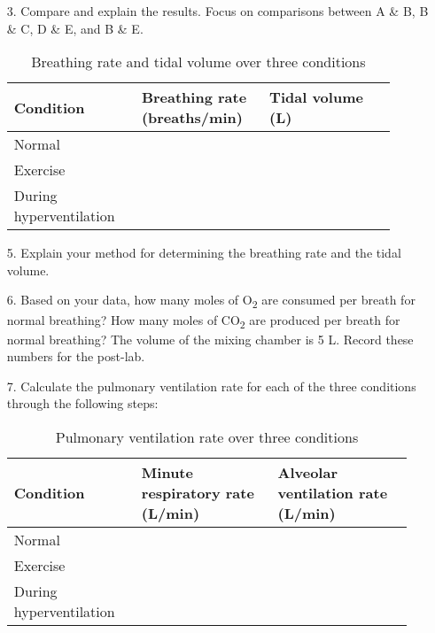 \documentclass{article}
\begin{document}
\begin{itemize}
	\item[3.] Compare and explain the results. Focus on comparisons between A \& B, B \& C, D \& E, and B \& E.\pagebreak
	
	\begin{table}[h]
	\centering
	\caption{Breathing rate and tidal volume over three conditions}
	\begin{tabular}[h!]{p{0.3\linewidth}p{0.3\linewidth}p{0.3\linewidth}}
	\toprule
	Condition & Breathing rate (breaths/min) & Tidal volume (L)\\\midrule
	Normal & & \\\midrule
	Exercise & & \\\midrule
	During hyperventilation & & \\
	\bottomrule
	\end{tabular}
	\end{table}\vspace{0cm}
	
	\item[5.] Explain your method for determining the breathing rate and the tidal volume.\vspace{3cm}
	\item[6.] Based on your data, how many moles of O\textsubscript{2} are consumed per breath for normal breathing? How many moles of CO\textsubscript{2} are produced per breath for normal breathing? The volume of the mixing chamber is 5 L. Record these numbers for the post-lab.\vspace{5cm}
	\item[7.] Calculate the pulmonary ventilation rate for each of the three conditions through the following steps:
	\begin{table}[h]
	\centering
	\caption{Pulmonary ventilation rate over three conditions}
	\begin{tabular}[h!]{p{0.3\linewidth}p{0.32\linewidth}p{0.32\linewidth}}
	\toprule
	Condition & Minute respiratory rate (L/min) & Alveolar ventilation rate (L/min)\\\midrule
	Normal & & \\\midrule
	Exercise & & \\\midrule
	During hyperventilation & & \\
	\bottomrule
	\end{tabular}
	\end{table}\vspace{0cm}
	

\end{itemize}
\end{document}
